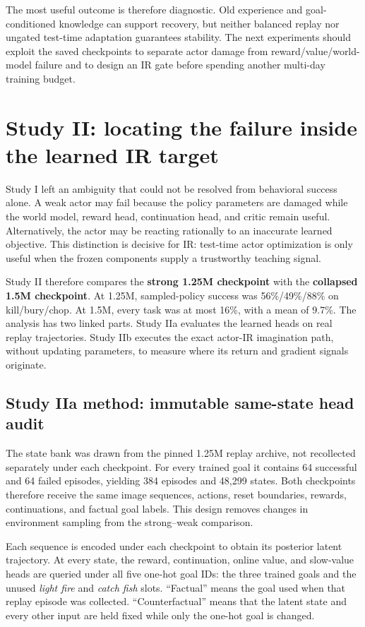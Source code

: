 \documentclass[10pt]{article}
\newcommand{\pct}[1]{#1\%}
\begin{document}
The most useful outcome is therefore diagnostic. Old experience and goal-conditioned knowledge can support recovery, but neither balanced replay nor ungated test-time adaptation guarantees stability. The next experiments should exploit the saved checkpoints to separate actor damage from reward/value/world-model failure and to design an IR gate before spending another multi-day training budget.

\section{Study II: locating the failure inside the learned IR target}

Study I left an ambiguity that could not be resolved from behavioral success alone. A weak actor may fail because the policy parameters are damaged while the world model, reward head, continuation head, and critic remain useful. Alternatively, the actor may be reacting rationally to an inaccurate learned objective. This distinction is decisive for IR: test-time actor optimization is only useful when the frozen components supply a trustworthy teaching signal.

Study II therefore compares the \textbf{strong 1.25M checkpoint} with the \textbf{collapsed 1.5M checkpoint}. At 1.25M, sampled-policy success was \pct{56}/\pct{49}/\pct{88} on kill/bury/chop. At 1.5M, every task was at most \pct{16}, with a mean of \pct{9.7}. The analysis has two linked parts. Study IIa evaluates the learned heads on real replay trajectories. Study IIb executes the exact actor-IR imagination path, without updating parameters, to measure where its return and gradient signals originate.

\subsection{Study IIa method: immutable same-state head audit}

The state bank was drawn from the pinned 1.25M replay archive, not recollected separately under each checkpoint. For every trained goal it contains 64 successful and 64 failed episodes, yielding 384 episodes and 48,299 states. Both checkpoints therefore receive the same image sequences, actions, reset boundaries, rewards, continuations, and factual goal labels. This design removes changes in environment sampling from the strong--weak comparison.

Each sequence is encoded under each checkpoint to obtain its posterior latent trajectory. At every state, the reward, continuation, online value, and slow-value heads are queried under all five one-hot goal IDs: the three trained goals and the unused \emph{light fire} and \emph{catch fish} slots. ``Factual'' means the goal used when that replay episode was collected. ``Counterfactual'' means that the latent state and every other input are held fixed while only the one-hot goal is changed.
\end{document}
